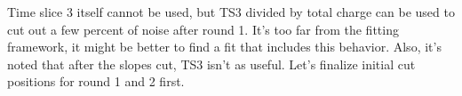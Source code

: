 
Time slice 3 itself cannot be used, but TS3 divided by total charge can be used to cut out a few percent of noise after round 1.
It's too far from the fitting framework, it might be better to find a fit that includes this behavior.
Also, it's noted that after the slopes cut, TS3 isn't as useful.  Let's finalize initial cut positions for round 1 and 2 first.

